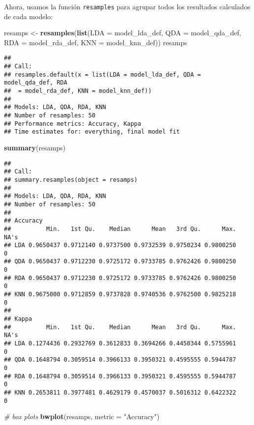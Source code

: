 \documentclass[]{book}
\newenvironment{Shaded}{\begin{snugshade}}{\end{snugshade}}
\newcommand{\CommentTok}[1]{\textcolor[rgb]{0.56,0.35,0.01}{\textit{#1}}}
\newcommand{\DataTypeTok}[1]{\textcolor[rgb]{0.13,0.29,0.53}{#1}}
\newcommand{\KeywordTok}[1]{\textcolor[rgb]{0.13,0.29,0.53}{\textbf{#1}}}
\newcommand{\NormalTok}[1]{#1}
\newcommand{\StringTok}[1]{\textcolor[rgb]{0.31,0.60,0.02}{#1}}
\begin{document}
Ahora, usamos la función \texttt{resamples} para agrupar todos los resultados calculados de cada modelo:

\begin{Shaded}
\begin{Highlighting}[]
\NormalTok{resamps <-}\StringTok{ }\KeywordTok{resamples}\NormalTok{(}\KeywordTok{list}\NormalTok{(}\DataTypeTok{LDA =}\NormalTok{ model_lda_def,}
                          \DataTypeTok{QDA =}\NormalTok{ model_qda_def,}
                          \DataTypeTok{RDA =}\NormalTok{ model_rda_def,}
                          \DataTypeTok{KNN =}\NormalTok{ model_knn_def))}
\NormalTok{resamps}
\end{Highlighting}
\end{Shaded}

\begin{verbatim}
## 
## Call:
## resamples.default(x = list(LDA = model_lda_def, QDA = model_qda_def, RDA
##  = model_rda_def, KNN = model_knn_def))
## 
## Models: LDA, QDA, RDA, KNN 
## Number of resamples: 50 
## Performance metrics: Accuracy, Kappa 
## Time estimates for: everything, final model fit
\end{verbatim}

\begin{Shaded}
\begin{Highlighting}[]
\KeywordTok{summary}\NormalTok{(resamps)}
\end{Highlighting}
\end{Shaded}

\begin{verbatim}
## 
## Call:
## summary.resamples(object = resamps)
## 
## Models: LDA, QDA, RDA, KNN 
## Number of resamples: 50 
## 
## Accuracy 
##          Min.   1st Qu.    Median      Mean   3rd Qu.      Max. NA's
## LDA 0.9650437 0.9712140 0.9737500 0.9732539 0.9750234 0.9800250    0
## QDA 0.9650437 0.9712230 0.9725172 0.9733785 0.9762426 0.9800250    0
## RDA 0.9650437 0.9712230 0.9725172 0.9733785 0.9762426 0.9800250    0
## KNN 0.9675000 0.9712859 0.9737828 0.9740536 0.9762500 0.9825218    0
## 
## Kappa 
##          Min.   1st Qu.    Median      Mean   3rd Qu.      Max. NA's
## LDA 0.1274436 0.2932769 0.3612833 0.3694266 0.4450344 0.5755961    0
## QDA 0.1648794 0.3059514 0.3966133 0.3950321 0.4595555 0.5944787    0
## RDA 0.1648794 0.3059514 0.3966133 0.3950321 0.4595555 0.5944787    0
## KNN 0.2653811 0.3977481 0.4629179 0.4570037 0.5016312 0.6422322    0
\end{verbatim}

\begin{Shaded}
\begin{Highlighting}[]
\CommentTok{# box plots}
\KeywordTok{bwplot}\NormalTok{(resamps, }\DataTypeTok{metric =} \StringTok{"Accuracy"}\NormalTok{)}
\end{Highlighting}
\end{Shaded}
\end{document}
